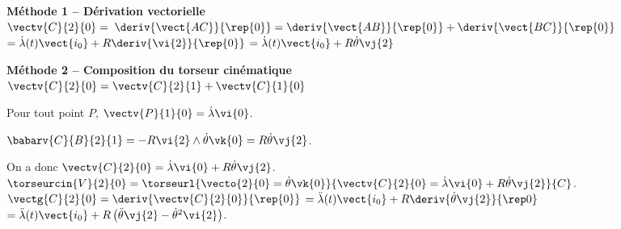 \begin{corrigebox}
\textbf{Méthode 1 -- Dérivation vectorielle} ~\\

$\vectv{C}{2}{0} =$
$\deriv{\vect{AC}}{\rep{0}}= \deriv{\vect{AB}}{\rep{0}}+\deriv{\vect{BC}}{\rep{0}}$
$= \dot{\lambda}(t) \vect{i_0} + R \deriv{\vi{2}}{\rep{0}}$
$= \dot{\lambda}(t) \vect{i_0} + R \dot{\theta} \vj{2}$

\textbf{Méthode 2 -- Composition du torseur cinématique} ~\\
$\vectv{C}{2}{0} =\vectv{C}{2}{1} +\vectv{C}{1}{0} $

Pour tout point $P$, $\vectv{P}{1}{0}=\dot{\lambda}\vi{0}$.

$\babarv{C}{B}{2}{1}=-R\vi{2}\wedge \dot{\theta}\vk{0}=R\dot{\theta}\vj{2}$.

On a donc $\vectv{C}{2}{0}=\dot{\lambda}\vi{0}+R\dot{\theta}\vj{2}$.
$\torseurcin{V}{2}{0}=\torseurl{\vecto{2}{0}=\dot{\theta}\vk{0}}{\vectv{C}{2}{0}=\dot{\lambda}\vi{0}+R\dot{\theta}\vj{2}}{C}$.
$\vectg{C}{2}{0} =\deriv{\vectv{C}{2}{0}}{\rep{0}}$
$= \ddot{\lambda}(t) \vect{i_0} + R \deriv{\dot{\theta} \vj{2}}{\rep0}$
$= \ddot{\lambda}(t) \vect{i_0} + R \left(\ddot{\theta} \vj{2} - \dot{\theta}^2 \vi{2}\right) $.
\end{corrigebox}
